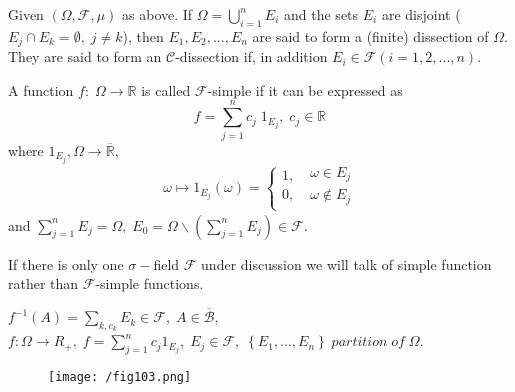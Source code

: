 Given $\left( {\Omega ,\mathcal{F},\mu } \right)$ as above. If $\Omega  = \bigcup\limits_{i = 1}^n {{E_i}} $ and the sets $ E_{i} $ are disjoint (${E_j} \cap {E_k} = \emptyset ,\;j \ne k$), then $ E_{1},E_{2},...,E_{n} $ are said to form a (finite) dissection of $ \Omega $. They are said to form an $ \mathcal{C} $-dissection if, in addition $ E_{i} \in \mathcal{F}(i=1,2,...,n) $.

\begin{definition}
	A function $f:\;\Omega  \to \mathbb{R}$ is called $ \mathcal{F} $-simple if it can be expressed as
	\begin{equation}
	f = \sum\limits_{j = 1}^n {{c_j}\;{1_{{E_j}}}} ,\;{c_j} \in \mathbb{R}
	\label{eq10.12}
	\end{equation}
	where $ 1_{E_{j}}, \Omega  \to \overline {\mathbb{R}}$,
	\begin{equation}
	\omega  \mapsto {1_{{E_j}}}\left( \omega  \right) = \left\{ {\begin{matrix}
		{1,}  \\ 
		{0,}  \\ 
		
		\end{matrix} } \right.\;\begin{matrix}
	{\omega  \in {E_j}}  \\ 
	{\omega  \notin {E_j}}  \\ 
	
	\end{matrix}
	\label{eq10.13} 
	\end{equation}
	\label{def10.2}
	and $\sum\limits_{j = 1}^n {{E_j}}  = \Omega ,\;{E_0} = \Omega \backslash \left( {\sum\limits_{j = 1}^n {{E_j}} } \right) \in \mathcal{F}$.
\end{definition}

If there is only one $\sigma-$field $\mathcal{F}$ under discussion we will talk of simple function rather than $ \mathcal{F} $-simple functions.

${f^{ - 1}}\left( A \right) = \sum\limits_{k,{c_k}} {{E_k}}  \in {\mathcal{F}},\;A \in \overline {\mathcal{B}},$ $f:\Omega  \to R{}_ + ,\;f = \sum\limits_{j = 1}^n {{c_j}{1_{{E_j}}}} ,\;{E_j} \in {\mathcal{F}},\;\left\{ {{E_1},...,{E_n}} \right\}\;partition\;of\;\Omega $.

\begin{figure}[!htb]
	\centering
	\texttt{[image: /fig103.png]}
\end{figure}

